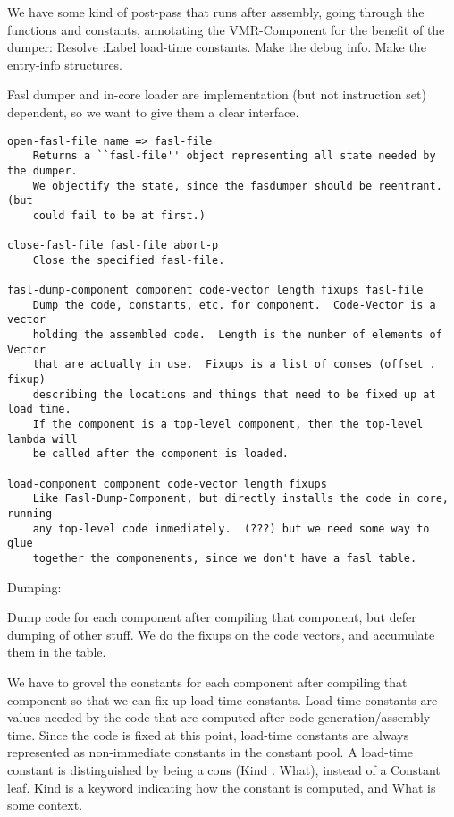 We have some kind of post-pass that runs after assembly, going through the
functions and constants, annotating the VMR-Component for the benefit of the
dumper:
    Resolve :Label load-time constants.
    Make the debug info.
    Make the entry-info structures.

Fasl dumper and in-core loader are implementation (but not instruction set)
dependent, so we want to give them a clear interface.

\begin{verbatim}
open-fasl-file name => fasl-file
    Returns a ``fasl-file'' object representing all state needed by the dumper.
    We objectify the state, since the fasdumper should be reentrant.  (but
    could fail to be at first.)

close-fasl-file fasl-file abort-p
    Close the specified fasl-file.

fasl-dump-component component code-vector length fixups fasl-file
    Dump the code, constants, etc. for component.  Code-Vector is a vector
    holding the assembled code.  Length is the number of elements of Vector
    that are actually in use.  Fixups is a list of conses (offset . fixup)
    describing the locations and things that need to be fixed up at load time.
    If the component is a top-level component, then the top-level lambda will
    be called after the component is loaded.

load-component component code-vector length fixups
    Like Fasl-Dump-Component, but directly installs the code in core, running
    any top-level code immediately.  (???) but we need some way to glue
    together the componenents, since we don't have a fasl table.
\end{verbatim}



Dumping:

Dump code for each component after compiling that component, but defer dumping
of other stuff.  We do the fixups on the code vectors, and accumulate them in
the table.

We have to grovel the constants for each component after compiling that
component so that we can fix up load-time constants.  Load-time constants are
values needed by the code that are computed after code generation/assembly
time.  Since the code is fixed at this point, load-time constants are always
represented as non-immediate constants in the constant pool.  A load-time
constant is distinguished by being a cons (Kind . What), instead of a Constant
leaf.  Kind is a keyword indicating how the constant is computed, and What is
some context.

